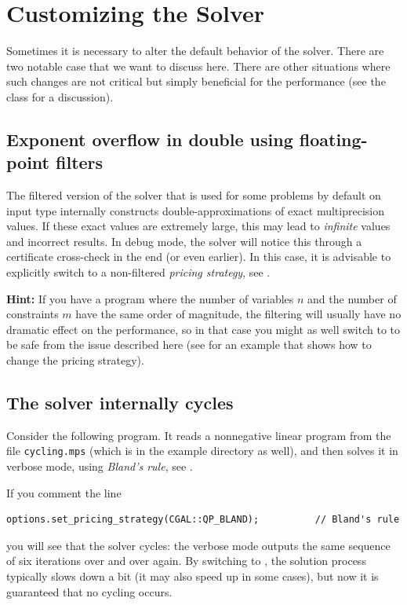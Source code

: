 \section{Customizing the Solver\label{sec:QP-customization}}
Sometimes it is necessary to alter the default behavior of the solver.
There are two notable case that we want to discuss here. There are
other situations where such changes are not critical but simply beneficial
for the performance (see the class 
for a discussion).

\subsection{Exponent overflow in double using floating-point filters\label{sec:QP-customization-filtering}}
The filtered version of the solver that is used for some problems
by default on input
type  internally constructs double-approximations of exact
multiprecision values. If these exact values are extremely large, this
may lead to \emph{infinite}  values and incorrect results.
In debug mode, the solver will notice this through a certificate 
cross-check in the end (or even earlier). In this case, it is advisable
to explicitly switch to a non-filtered \emph{pricing strategy}, see
.

{\bf Hint:} 
If you have a program where the number of variables $n$ and the number of
constraints $m$ have the same order of 
magnitude, the filtering will usually have
no dramatic effect on the performance, so in that case you might as well 
switch to  
to be safe from the issue described here (see 
for an example that shows how to change the pricing strategy).

\subsection{The solver internally cycles\label{sec:QP-customization-cycling}}
Consider the following program. It reads a nonnegative linear program from 
the file \texttt{cycling.mps} (which is in the example directory as well),
and then solves it in verbose mode, using \emph{Bland's rule}, see
.


If you comment the line 
\begin{verbatim}
options.set_pricing_strategy(CGAL::QP_BLAND);          // Bland's rule
\end{verbatim}
you will see that the solver cycles: the verbose mode outputs the same
sequence of six iterations over and over again. By switching to 
, the solution process typically slows down a bit 
(it may also speed up in some cases), but now it is guaranteed that
no cycling occurs.

